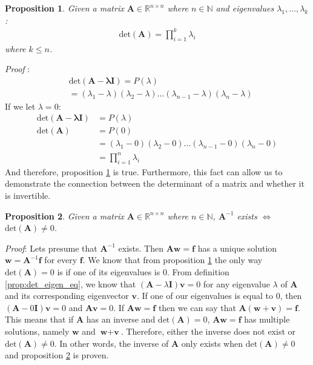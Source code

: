 \documentclass[a4paper,12pt]{article}
\newcommand{\matrx}[1]{\bm{#1}}
\newcommand{\vectr}[1]{\textbf{#1}}
\newcommand{\real}{\mathbb{R}}
\newcommand{\natral}{\mathbb{N}}
\newcommand{\italic}[1]{\textit{#1}}
\newcommand{\dett}[1]{\text{det}(\matrx{#1})}
\newtheorem{proposition}{Proposition}[section]
\begin{document}
	\begin{proposition}
		\normalfont Given a matrix $ \matrx{A} \in \real^{n \times n} $ where $ n \in \natral $ and eigenvalues $ \lambda_1,\ldots,\lambda_k $: 
		\begin{align}
			\dett{\matrx{A}} = \prod_{i = 1}^{k} \lambda_i
		\end{align}
		where $ k \leq n $. 
		\label{prop:det_prod_eigen}
	\end{proposition}
	\italic{Proof} \cite{proof_det_prod_eigen}: 
	\begin{align}
		&\dett{\matrx{A} - \lambda \matrx{I}} = P(\lambda) \\ 
		&= (\lambda_1 - \lambda)(\lambda_2 - \lambda)\ldots(\lambda_{n - 1} - \lambda)(\lambda_n - \lambda)
	\end{align}
	If we let $ \lambda = 0$:
	\begin{align}
		\dett{A - \lambda\matrx{I}} &= P(\lambda) \\
		\dett{A} &= P(0) \\
		&= (\lambda_1 - 0)(\lambda_2 - 0)\ldots(\lambda_{n - 1} - 0)(\lambda_n - 0) \\
		&= \prod_{i = 1}^{n} \lambda_i
	\end{align}
	And therefore, proposition \ref{prop:det_prod_eigen} is true. Furthermore, this fact can allow us to demonstrate the connection between the determinant of a matrix and whether it is invertible.
	\begin{proposition}
		\normalfont Given a matrix $ \matrx{A} \in \real^{n \times n} $ where $ n \in \natral $, $ \matrx{A}^{-1} $ exists $\iff$ $ \dett{A} \ne 0 $.
		\label{prop:det_eq_inv}
	\end{proposition}
	\italic{Proof}: Lets presume that $ \matrx{A}^{-1} $ exists. Then $ \matrx{A}\vectr{w} = \vectr{f} $ has a unique solution $ \vectr{w} = \matrx{A}^{-1}\vectr{f} $ for every $ \vectr{f} $.  We know that from proposition \ref{prop:det_prod_eigen} the only way $ \dett{A} = 0 $ is if one of its eigenvalues is $ 0 $. From definition \ref{prop:det_eigen_eq}, we know that $ (\matrx{A} - \lambda\matrx{I})\vectr{v} = 0 $ for any eigenvalue $ \lambda $ of $ \matrx{A} $ and its corresponding eigenvector $ \vectr{v} $. If one of our eigenvalues is equal to $ 0 $, then $ (\matrx{A} - 0\matrx{I})\vectr{v} = 0$ and $ \matrx{A}\vectr{v} = 0 $. If $ \matrx{A}\vectr{w} = \vectr{f} $ then we can say that $ \matrx{A}(\vectr{w} + \vectr{v}) = \vectr{f} $. This means that if $ \matrx{A} $ has an inverse and $ \dett{A} = 0 $, $ \matrx{A}\vectr{w} = \vectr{f} $ has multiple solutions, namely $ \vectr{w} $ and $ \vectr{w} + \vectr{v} $. Therefore, either the inverse does not exist or $ \dett{A} \ne 0 $. In other words, the inverse of $ \matrx{A} $ only exists when $ \dett{A} \ne 0$ and proposition \ref{prop:det_eq_inv} is proven. 
	
\end{document}

